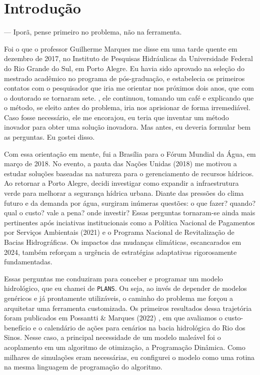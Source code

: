 \documentclass[./main.tex]{subfiles}
\begin{document}
\chapter{Introdução}

\setlength{\parskip}{\myparskip}

 --- Iporã, pense primeiro no problema, não na ferramenta. 

\vspace{1.0cm} 

\noindent Foi o que o professor Guilherme Marques me disse em uma tarde quente em dezembro de 2017, no Instituto de Pesquisas Hidráulicas da Universidade Federal do Rio Grande do Sul, em Porto Alegre. Eu havia sido aprovado na seleção do mestrado acadêmico no programa de pós-graduação, e estabelecia os primeiros contatos com o pesquisador que iria me orientar nos próximos dois anos, que com o doutorado se tornaram sete. , ele continuou, tomando um café e explicando que o método, se eleito antes do problema, iria nos aprisionar de forma irremediável. Caso fosse necessário, ele me encorajou, eu teria que inventar um método inovador para obter uma solução inovadora. Mas antes, eu deveria formular bem as perguntas. Eu gostei disso. 

\par Com essa orientação em mente, fui a Brasília para o Fórum Mundial da Água, em março de 2018. No evento, a pauta das Nações Unidas (2018) \cite{un2018} me motivou a estudar soluções baseadas na natureza para o gerenciamento de recursos hídricos. Ao retornar a Porto Alegre, decidi investigar como expandir a infraestrutura verde para melhorar a segurança hídrica urbana. Diante das pressões do clima futuro e da demanda por água, surgiram inúmeras questões: o que fazer? quando? qual o custo? vale a pena? onde investir? Essas perguntas tornaram-se ainda mais pertinentes após inciativas institucionais como a Política Nacional de Pagamentos por Serviços Ambientais (2021) \cite{brasil2021} e o Programa Nacional de Revitalização de Bacias Hidrográficas. Os impactos das mudanças climáticas, escancarados em 2024, também reforçam a urgência de estratégias adaptativas rigorosamente fundamentadas.

\par Essas perguntas me conduziram para conceber e programar um modelo hidrológico, que eu chamei de \texttt{PLANS}. Ou seja, ao invés de depender de modelos genéricos e já prontamente utilizáveis, o caminho do problema me forçou a arquitetar uma ferramenta customizada. Os primeiros resultados dessa trajetória foram publicados em Possantti \& Marques (2022) \cite{Possantti2022a}, em que avaliamos o custo-benefício e o calendário de ações para cenários na bacia hidrológica do Rio dos Sinos. Nesse caso, a principal necessidade de um modelo maleável foi o acoplamento em um algoritmo de otimização, a Programação Dinâmica. Como milhares de simulações eram necessárias, eu configurei o modelo como uma rotina na mesma linguagem de programação do algoritmo. 
\end{document}
